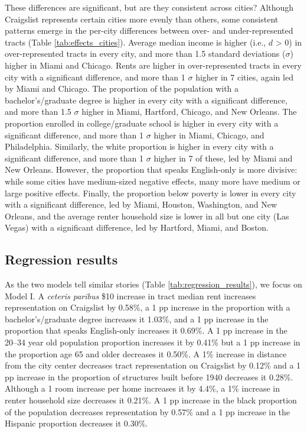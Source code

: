 \documentclass[11pt,letterpaper]{article}
\begin{document}
These differences are significant, but are they consistent across cities? Although Craigslist represents certain cities more evenly than others, some consistent patterns emerge in the per-city differences between over- and under-represented tracts (Table \ref{tab:effects_cities}). Average median income is higher (i.e., $d$ > 0) in over-represented tracts in every city, and more than 1.5 standard deviations ($\sigma$) higher in Miami and Chicago. Rents are higher in over-represented tracts in every city with a significant difference, and more than 1 $\sigma$ higher in 7 cities, again led by Miami and Chicago. The proportion of the population with a bachelor's/graduate degree is higher in every city with a significant difference, and more than 1.5 $\sigma$ higher in Miami, Hartford, Chicago, and New Orleans. The proportion enrolled in college/graduate school is higher in every city with a significant difference, and more than 1 $\sigma$ higher in Miami, Chicago, and Philadelphia. Similarly, the white proportion is higher in every city with a significant difference, and more than 1 $\sigma$ higher in 7 of these, led by Miami and New Orleans. However, the proportion that speaks English-only is more divisive: while some cities have medium-sized negative effects, many more have medium or large positive effects. Finally, the proportion below poverty is lower in every city with a significant difference, led by Miami, Houston, Washington, and New Orleans, and the average renter household size is lower in all but one city (Las Vegas) with a significant difference, led by Hartford, Miami, and Boston.

\subsection{Regression results}

As the two models tell similar stories (Table \ref{tab:regression_results}), we focus on Model I. A \textit{ceteris paribus} \$10 increase in tract median rent increases representation on Craigslist by 0.58\%, a 1 pp increase in the proportion with a bachelor's/graduate degree increases it 1.03\%, and a 1 pp increase in the proportion that speaks English-only increases it 0.69\%. A 1 pp increase in the 20--34 year old population proportion increases it by 0.41\% but a 1 pp increase in the proportion age 65 and older decreases it 0.50\%. A 1\% increase in distance from the city center decreases tract representation on Craigslist by 0.12\% and a 1 pp increase in the proportion of structures built before 1940 decreases it 0.28\%. Although a 1 room increase per home increases it by 4.4\%, a 1\% increase in renter household size decreases it 0.21\%. A 1 pp increase in the black proportion of the population decreases representation by 0.57\% and a 1 pp increase in the Hispanic proportion decreases it 0.30\%. 
\end{document}
